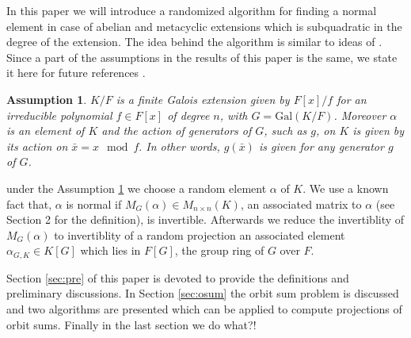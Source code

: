 \documentclass[sigconf]{acmart}
\newcommand{\osum}[2]{\alpha_{#1,#2}}
\theoremstyle{acmplain}
\newtheorem{assumption}{Assumption}
\begin{document}
In this paper we will introduce a randomized algorithm for finding a normal element in case of abelian and metacyclic extensions
 which is subquadratic in the degree of the extension. The idea behind the algorithm is similar to ideas of 
\cite{Giesbrecht,Kaltofen}. Since a part of the assumptions in the results of this paper is the same, we state it here 
for future references .

\begin{assumption}\label{assum}
$K/F$ is a finite Galois extension given by $ F[x]/f$ for an irreducible polynomial $f\in F[x]$ of degree $n$, with
 $G = \mathrm{Gal}(K/F)$. Moreover $\alpha$ is an element of $K$ and the action of generators of $ G$, such as $g$, on $K$ is given by its action on $\bar{x} = x \mod f.$ In other words, $g(\bar{x})$ is given for any generator $g$ of $G$.
\end{assumption}

under the Assumption \ref{assum} we choose a random element $\alpha$ of $K$. We use a known fact that, $\alpha$ is normal 
if $M_G(\alpha) \in M_{n\times n}(K)$, an associated matrix to $\alpha$ (see Section 2 for the definition), is invertible. 
Afterwards we reduce the invertiblity of $M_G(\alpha)$ to invertiblity of a random projection an associated element 
$\osum{G}{K} \in K[G]$ which lies in $F[G]$, the group ring of $G$ over $F$. 

Section \ref{sec:pre} of this paper is devoted to provide the definitions and preliminary discussions. In Section \ref{sec:osum} 
the orbit sum problem is discussed and two algorithms are presented which can be applied to compute projections of orbit sums.
Finally in the last section we do what?!
\end{document}
